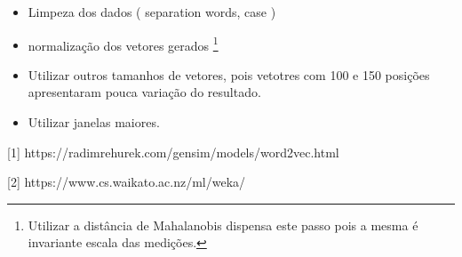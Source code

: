 \documentclass[
	article,			%
	11pt,				%
	oneside,			%
	a4paper,			%
	english,			%
	brazil,				%
	sumario=tradicional,
	fleqn				%
	]{abntex2}
\begin{document}
\begin{itemize}
	\item Limpeza dos dados ( separation words, case ) 
	\item normalização dos vetores gerados \footnote{ Utilizar a distância de Mahalanobis dispensa este passo pois a mesma é invariante escala das medições.}
	\item Utilizar outros tamanhos de vetores, pois vetotres com 100 e 150 posições apresentaram pouca variação do resultado.
	\item Utilizar janelas maiores.
\end{itemize}


\postextual



[1] https://radimrehurek.com/gensim/models/word2vec.html

[2] https://www.cs.waikato.ac.nz/ml/weka/
\end{document}
